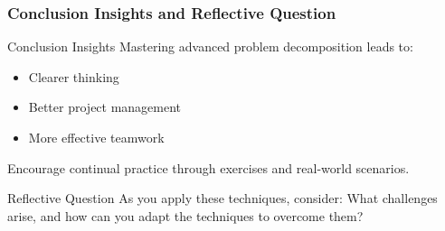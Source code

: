 \documentclass[aspectratio=169]{beamer}
\begin{document}
\begin{frame}[fragile]
    \frametitle{Conclusion Insights and Reflective Question}
    \begin{block}{Conclusion Insights}
        Mastering advanced problem decomposition leads to:
        \begin{itemize}
            \item Clearer thinking
            \item Better project management
            \item More effective teamwork
        \end{itemize}
        Encourage continual practice through exercises and real-world scenarios.
    \end{block}
    \begin{block}{Reflective Question}
        As you apply these techniques, consider: What challenges arise, and how can you adapt the techniques to overcome them?
    \end{block}
\end{frame}
\end{document}
